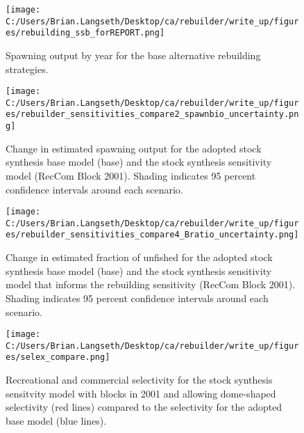 \documentclass[11pt,
  english,
  letterpaper,
]{article}
\begin{document}
\tagmcend\tagstructend


\begin{figure}
\centering
\texttt{[image: C:/Users/Brian.Langseth/Desktop/ca/rebuilder/write\_up/figures/rebuilding\_ssb\_forREPORT.png]}
\caption{Spawning output by year for the base alternative rebuilding strategies.\label{fig:ssb-fig}}
\end{figure}

\tagmcend\tagstructend


\begin{figure}
\centering
\texttt{[image: C:/Users/Brian.Langseth/Desktop/ca/rebuilder/write\_up/figures/rebuilder\_sensitivities\_compare2\_spawnbio\_uncertainty.png]}
\caption{Change in estimated spawning output for the adopted stock synthesis base model (base) and the stock synthesis sensitivity model (RecCom Block 2001). Shading indicates 95 percent confidence intervals around each scenario.\label{fig:ssb-sens}}
\end{figure}

\tagmcend\tagstructend


\begin{figure}
\centering
\texttt{[image: C:/Users/Brian.Langseth/Desktop/ca/rebuilder/write\_up/figures/rebuilder\_sensitivities\_compare4\_Bratio\_uncertainty.png]}
\caption{Change in estimated fraction of unfished for the adopted stock synthesis base model (base) and the stock synthesis sensitivity model that informs the rebuilding sensitivity (RecCom Block 2001). Shading indicates 95 percent confidence intervals around each scenario.\label{fig:depl-sens}}
\end{figure}

\tagmcend\tagstructend


\begin{figure}
\centering
\texttt{[image: C:/Users/Brian.Langseth/Desktop/ca/rebuilder/write\_up/figures/selex\_compare.png]}
\caption{Recreational and commercial selectivity for the stock synthesis sensitvity model with blocks in 2001 and allowing dome-shaped selectivity (red lines) compared to the selectivity for the adopted base model (blue lines).\label{fig:selex-sens}}
\end{figure}
\end{document}

